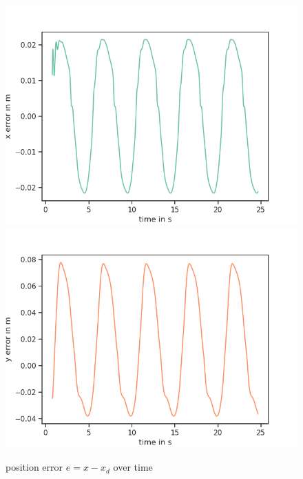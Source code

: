 \documentclass[a4paper,10pt]{article}
\begin{document}
\begin{figure}[H]
  \centering
  \includegraphics[scale=0.6]{img/C3_error0}
  \includegraphics[scale=0.6]{img/C3_error1}
  \caption{position error $e = x - x_d$ over time}
\end{figure}
\end{document}
